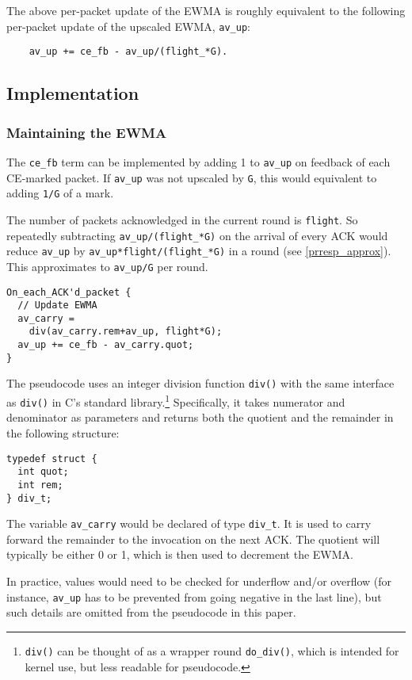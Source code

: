 The above per-packet update of the EWMA is roughly equivalent to the following
per-packet update of the upscaled EWMA, \texttt{av\_up}:
\begin{verbatim}
    av_up += ce_fb - av_up/(flight_*G).
\end{verbatim}

\subsection{Implementation}\label{prresp_implementation}

\subsubsection{Maintaining the EWMA}

The \texttt{ce\_fb} term can be implemented by adding 1 to \texttt{av\_up} on
feedback of each CE-marked packet. If \texttt{av\_up} was not upscaled by
\texttt{G}, this would equivalent to adding \texttt{1/G} of a mark.

The number of packets acknowledged in the current round is \texttt{flight}. So
repeatedly subtracting \texttt{av\_up/(flight\_*G)} on the arrival of every ACK
would reduce \texttt{av\_up} by \texttt{av\_up*flight/(flight\_*G)} in a round
(see \autoref{prresp_approx}). This approximates to \texttt{av\_up/G} per round.

\begin{verbatim}
On_each_ACK'd_packet {
  // Update EWMA
  av_carry = 
    div(av_carry.rem+av_up, flight*G);
  av_up += ce_fb - av_carry.quot;
}
\end{verbatim}

The pseudocode uses an integer division function \texttt{div()} with the same
interface as \texttt{div()} in C's standard library.\footnote{\texttt{div()} can
be thought of as a wrapper round \texttt{do\_div()}, which is intended for
kernel use, but less readable for pseudocode.} Specifically, it takes numerator
and denominator as parameters and returns both the
quotient and the remainder in the following structure:
\begin{verbatim}
typedef struct {
  int quot;
  int rem;
} div_t;
\end{verbatim}
The variable \texttt{av\_carry} would be declared of type \texttt{div\_t}. It is
used to carry forward the remainder to the invocation on the next ACK. The
quotient will typically be either 0 or 1, which is then used to decrement the
EWMA.

In practice, values would need to be checked for underflow and/or overflow (for
instance, \texttt{av\_up} has to be prevented from going negative in the last
line), but such details are omitted from the pseudocode in this paper.

